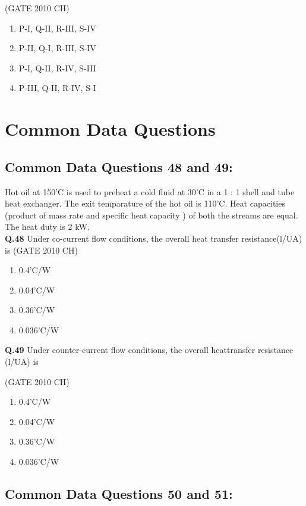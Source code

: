 \documentclass[journal,12pt,onecolumn]{exam}
\theoremstyle{remark}
\begin{document}
 \hfill{(GATE 2010 CH)}\\


\begin{enumerate}
    \item P-I, Q-II, R-III, S-IV
    \item P-II, Q-I, R-III, S-IV
    \item P-I, Q-II, R-IV, S-III
    \item P-III, Q-II, R-IV, S-I
\end{enumerate}

\section{Common Data Questions}
\subsection{Common Data Questions 48 and 49:}

Hot oil at 150'C is used to preheat a cold fluid at 30'C in a  1 : 1 shell and tube heat exchanger. The exit temparature of the hot oil is 110'C. Heat capacities (product of mass rate and specific heat capacity ) of both the streams are equal. The heat duty is 2 kW.\\ 

 \noindent
 \textbf{Q.48}
  Under co-current flow conditions, the overall heat transfer resistance(l/UA) is
  \hfill{(GATE 2010 CH)}\\
  \begin{enumerate}
      \item 0.4'C/W
      \item 0.04'C/W
      \item 0.36'C/W
      \item 0.036'C/W
  \end{enumerate}

   \noindent
   \textbf{Q.49}
    Under counter-current flow conditions, the overall heattransfer resistance (l/UA) is
 
 \hfill{(GATE 2010 CH)}\\

  
  \begin{enumerate}
      \item 0.4'C/W
      \item 0.04'C/W
      \item 0.36'C/W
      \item 0.036'C/W
  \end{enumerate}

\subsection{Common Data Questions 50 and 51:}
\end{document}
